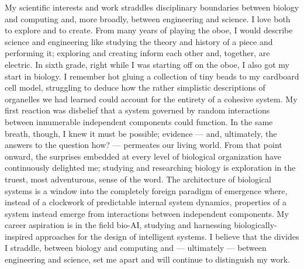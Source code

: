 \documentclass[12pt]{book}
\begin{document}
\maketitle


My scientific interests and work straddles disciplinary boundaries between biology and computing and, more broadly, between engineering and science. I love both to explore and to create. From many years of playing the oboe, I would describe science and engineering like studying the theory and history of a piece and performing it; exploring and creating inform each other and, together, are electric. In sixth grade, right while I was starting off on the oboe, I also got my start in biology. I remember hot gluing a collection of tiny beads to my cardboard cell model, struggling to deduce how the rather simplistic descriptions of organelles we had learned could account for the entirety of a cohesive system. My first reaction was disbelief that a system governed by random interactions between innumerable independent components could function. In the same breath, though, I knew it must be possible; evidence --- and, ultimately, the answers to the question how? --- permeates our living world. From that point onward, the surprises embedded at every level of biological organization have continuously delighted me; studying and researching biology is exploration in the truest, most adventurous, sense of the word. The architecture of biological systems is a window into the completely foreign paradigm of emergence where, instead of a clockwork of predictable internal system dynamics, properties of a system instead emerge from interactions between independent components. My career aspiration is in the field bio-AI, studying and harnessing biologically-inspired approaches for the design of intelligent systems. I believe that the divides I straddle, between biology and computing and --- ultimately --- between engineering and science, set me apart and will continue to distinguish my work.
\end{document}
